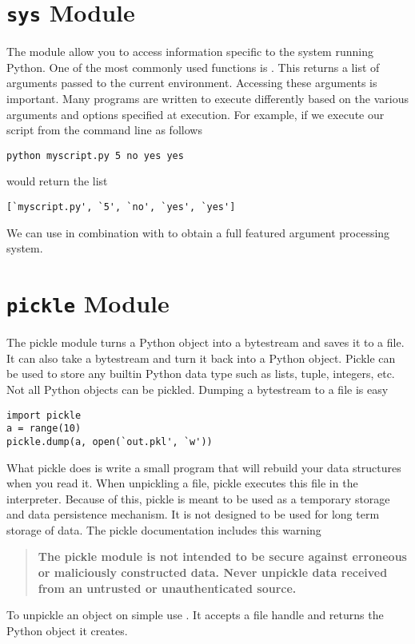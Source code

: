 \section*{\texttt{sys} Module}
The  module allow you to access information specific to the system running Python.
One of the most commonly used functions is .  This returns a list of arguments passed to the current environment.  Accessing these arguments is important.  Many programs are written to execute differently based on the various arguments and options specified at execution.  For example, if we execute our script from the command line as follows
\begin{verbatim}
python myscript.py 5 no yes yes
\end{verbatim}
 would return the list
\begin{verbatim}
[`myscript.py', `5', `no', `yes', `yes']
\end{verbatim}
We can use  in combination with  to obtain a full featured argument processing system.

\section*{\texttt{pickle} Module}
The pickle module turns a Python object into a bytestream and saves it to a file.
It can also take a bytestream and turn it back into a Python object.
Pickle can be used to store any builtin Python data type such as lists, tuple, integers, etc.
Not all Python objects can be pickled.
Dumping a bytestream to a file is easy
\begin{lstlisting}
import pickle
a = range(10)
pickle.dump(a, open(`out.pkl', `w'))
\end{lstlisting}
What pickle does is write a small program that will rebuild your data structures when you read it.
When unpickling a file, pickle executes this file in the interpreter.  Because of this,
pickle is meant to be used as a temporary storage and data persistence mechanism.  It is not designed
to be used for long term storage of data.  The pickle documentation includes this warning
\begin{quote}
\textbf{The pickle module is not intended to be secure against erroneous or maliciously constructed data. Never unpickle data received from an untrusted or unauthenticated source.}
\end{quote}
To unpickle an object on simple use .  It accepts a file handle and returns the Python object it creates.


